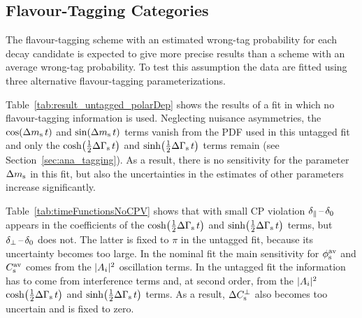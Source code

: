 \subsection{Flavour-Tagging Categories}
\label{subsec:result_altParam_tagCats}

The flavour-tagging scheme with an estimated wrong-tag probability for each decay candidate is expected to give more precise
results than a scheme with an average wrong-tag probability. To test this assumption the data are fitted using three alternative
flavour-tagging parameterizations.

Table~\ref{tab:result_untagged_polarDep} shows the results of a fit in which no flavour-tagging information is used. Neglecting \BsBsbar{}
nuisance asymmetries, the $\cos\!\left(\Delta m_\text{s}\, t\right)$ and $\sin\!\left(\Delta m_\text{s}\, t\right)$ terms vanish from the PDF used in this untagged fit and only the $\cosh\!\left(\tfrac{1}{2}\Delta\Gamma_\text{s}\, t\right)$ and $\sinh\!\left(\tfrac{1}{2}\Delta\Gamma_\text{s}\, t\right)$ terms
remain (see Section~\ref{sec:ana_tagging}). As a result, there is no sensitivity for the parameter $\Delta m_\text{s}$ in this fit, but also the
uncertainties in the estimates of other parameters increase significantly.

Table~\ref{tab:timeFunctionsNoCPV} shows that with small CP violation $\delta_{\parallel}\,\text{--}\,\delta_{0}$ appears in the coefficients of the $\cosh\!\left(\tfrac{1}{2}\Delta\Gamma_\text{s}\, t\right)$ and $\sinh\!\left(\tfrac{1}{2}\Delta\Gamma_\text{s}\, t\right)$
terms, but $\delta_{\perp}\,\text{--}\,\delta_{0}$ does not. The latter is fixed to $\pi$ in the untagged fit, because its uncertainty becomes too large. In the
nominal fit the main sensitivity for $\phi_\text{s}^{\text{av}}$ and $C_\text{s}^\text{av}$ comes from the $|A_{i}|^2$ oscillation terms. In the untagged fit the information
has to come from interference terms and, at second order, from the $|A_{i}|^2$ $\cosh\!\left(\tfrac{1}{2}\Delta\Gamma_\text{s}\, t\right)$ and $\sinh\!\left(\tfrac{1}{2}\Delta\Gamma_\text{s}\, t\right)$ terms. As a result, $\Delta C_\text{s}^\perp$ also
becomes too uncertain and is fixed to zero.

